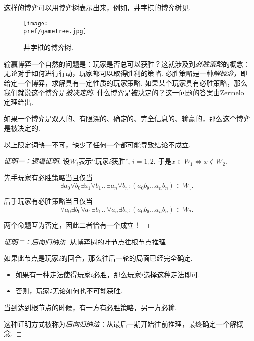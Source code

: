 这样的博弈可以用博弈树表示出来，例如，井字棋的博弈树见.

\begin{figure}
    \centering
    \texttt{[image: \\pref/gametree.jpg]}
    \caption{井字棋的博弈树.}
    \label{fig:gametree}
\end{figure}

输赢博弈一个自然的问题是：玩家是否总可以获胜？这就涉及到\emph{必胜策略}的概念：无论对手如何进行行动，玩家都可以取得胜利的策略. 必胜策略是一种\emph{解概念}，即给定一个博弈，求解具有一定性质的玩家策略. 如果某个玩家具有必胜策略，那么我们就说这个博弈是\emph{被决定的}. 什么博弈是被决定的？这一问题的答案由Zermelo定理给出.

\begin{theorem}\label{thm:zermelo}
如果一个博弈是双人的、有限深的、确定的、完全信息的、输赢的，那么这个博弈是被决定的.
\end{theorem}
以上限定词缺一不可，缺少了任何一个都可能导致结论不成立.

\begin{proof}[证明一：逻辑证明]
设$W_i$表示“玩家$i$获胜”, $i=1,2$. 于是$x\in W_1\iff x\not\in W_2$.

先手玩家有必胜策略当且仅当
\[\exists a_0\forall b_0\exists a_1\forall b_1\dots\exists a_n\forall b_n: (a_0b_0\dots a_nb_n)\in W_1.\]

后手玩家有必胜策略当且仅当
\[\forall a_0\exists b_0\forall a_1\exists b_1\dots\forall a_n\exists b_n: (a_0b_0\dots a_nb_n)\in W_2.\]

两个命题互为否定，因此二者恰有一个成立！
\end{proof}

\begin{proof}[证明二：后向归纳法]
从博弈树的叶节点往根节点推理.

如果此节点是玩家$i$的回合，那么往后一轮的局面已经完全确定.
\begin{itemize}
    \item 如果有一种走法使得玩家$i$必胜，那么玩家$i$选择这种走法即可.
    \item 否则，玩家$i$无论如何也不可能获胜.
\end{itemize}

当到达到根节点的时候，有一方有必胜策略，另一方必输.

这种证明方式被称为\emph{后向归纳法}：从最后一期开始往前推理，最终确定一个解概念.
\end{proof}

